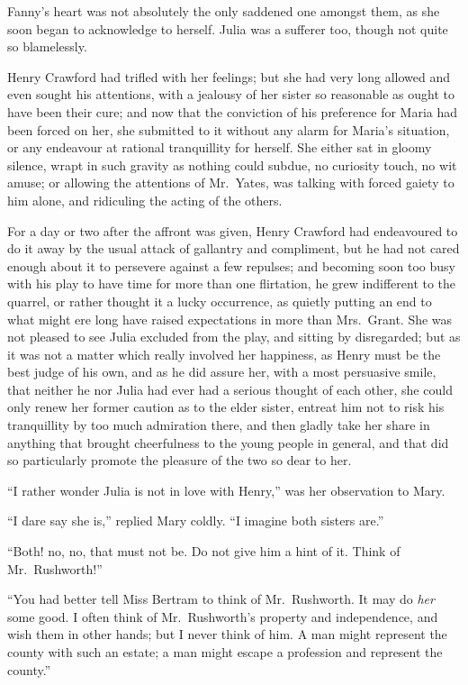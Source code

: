 Fanny's heart was not absolutely the only saddened one
amongst them, as she soon began to acknowledge to herself.
Julia was a sufferer too, though not quite so blamelessly.

Henry Crawford had trifled with her feelings; but she
had very long allowed and even sought his attentions,
with a jealousy of her sister so reasonable as ought
to have been their cure; and now that the conviction
of his preference for Maria had been forced on her,
she submitted to it without any alarm for Maria's situation,
or any endeavour at rational tranquillity for herself.
She either sat in gloomy silence, wrapt in such gravity
as nothing could subdue, no curiosity touch, no wit amuse;
or allowing the attentions of Mr.\ Yates, was talking with
forced gaiety to him alone, and ridiculing the acting of
the others.

For a day or two after the affront was given,
Henry Crawford had endeavoured to do it away by the usual
attack of gallantry and compliment, but he had not cared
enough about it to persevere against a few repulses;
and becoming soon too busy with his play to have time
for more than one flirtation, he grew indifferent to
the quarrel, or rather thought it a lucky occurrence,
as quietly putting an end to what might ere long
have raised expectations in more than Mrs.\ Grant.
She was not pleased to see Julia excluded from the play,
and sitting by disregarded; but as it was not a matter
which really involved her happiness, as Henry must be the
best judge of his own, and as he did assure her, with a
most persuasive smile, that neither he nor Julia had ever
had a serious thought of each other, she could only renew
her former caution as to the elder sister, entreat him
not to risk his tranquillity by too much admiration there,
and then gladly take her share in anything that brought
cheerfulness to the young people in general, and that did
so particularly promote the pleasure of the two so dear to her.

``I rather wonder Julia is not in love with Henry,''
was her observation to Mary.

``I dare say she is,'' replied Mary coldly.  ``I imagine
both sisters are.''

``Both! no, no, that must not be.  Do not give him a hint
of it.  Think of Mr.\ Rushworth!''

``You had better tell Miss Bertram to think of Mr.\ Rushworth.
It may do \emph{her} some good.  I often think of Mr.\ Rushworth's
property and independence, and wish them in other hands;
but I never think of him.  A man might represent the county
with such an estate; a man might escape a profession
and represent the county.''

